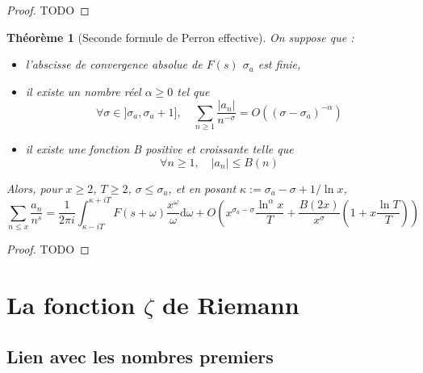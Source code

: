 \documentclass[french]{report}
\newtheorem{theorem}{Théorème}[section]
\begin{document}
\begin{proof}
  TODO
\end{proof}

\begin{theorem}[Seconde formule de Perron effective]\label{eq:perron-2-effective}
  On suppose que :
  \begin{itemize}
    \item l'abscisse de convergence absolue de $F(s)$ $\sigma_a$ est finie,
    \item il existe un nombre réel $\alpha\geq0$ tel que
    \[ \forall\sigma\in]\sigma_a,\sigma_a+1],\quad\sum_{n\geq1}\frac{|a_n|}{n^{-\sigma}}=O((\sigma-\sigma_a)^{-\alpha}) \]
    \item il existe une fonction B positive et croissante telle que
    \[ \forall n\geq1,\quad|a_n|\leq B(n) \]
  \end{itemize}
  Alors, pour $x\geq2$, $T\geq2$, $\sigma\leq\sigma_a$, et en posant $\kappa:=\sigma_a-\sigma+1/\ln x$,
  \[ \sum_{n\leq x}\frac{a_n}{n^s}=\frac{1}{2\pi i}\int_{\kappa-iT}^{\kappa+iT}F(s+\omega)\frac{x^\omega}{\omega}\mathrm{d}\omega + O\left(x^{\sigma_a-\sigma}\frac{\ln^\alpha x}{T}+\frac{B(2x)}{x^\sigma}\left(1+x\frac{\ln T}{T}\right)\right) \]
\end{theorem}

\begin{proof}
  TODO
\end{proof}

\chapter{La fonction $\zeta$ de Riemann}

\section{Lien avec les nombres premiers}
\end{document}
